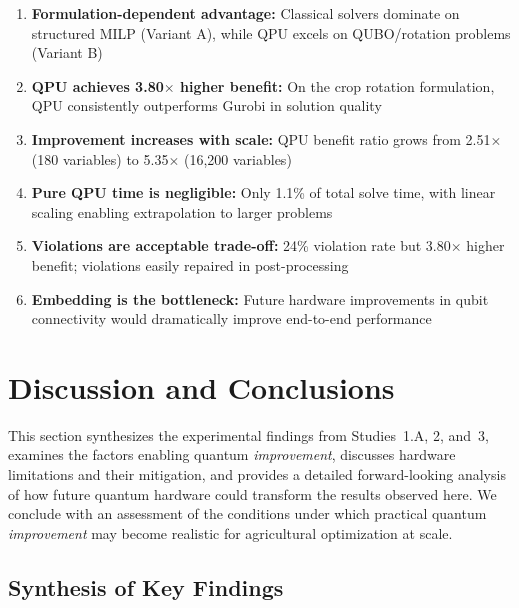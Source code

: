 \begin{enumerate}
    \item \textbf{Formulation-dependent advantage:} Classical solvers dominate on structured MILP (Variant A), while QPU excels on QUBO/rotation problems (Variant B)
    
    \item \textbf{QPU achieves 3.80$\times$ higher benefit:} On the crop rotation formulation, QPU consistently outperforms Gurobi in solution quality
    
    \item \textbf{Improvement increases with scale:} QPU benefit ratio grows from 2.51$\times$ (180 variables) to 5.35$\times$ (16,200 variables)
    
    \item \textbf{Pure QPU time is negligible:} Only 1.1\% of total solve time, with linear scaling enabling extrapolation to larger problems
    
    \item \textbf{Violations are acceptable trade-off:} 24\% violation rate but 3.80$\times$ higher benefit; violations easily repaired in post-processing
    
    \item \textbf{Embedding is the bottleneck:} Future hardware improvements in qubit connectivity would dramatically improve end-to-end performance
\end{enumerate}

\section{Discussion and Conclusions}
\label{sec:discussion}

This section synthesizes the experimental findings from Studies~1.A, 2, and~3, examines the factors enabling quantum \textit{improvement}, discusses hardware limitations and their mitigation, and provides a detailed forward-looking analysis of how future quantum hardware could transform the results observed here. We conclude with an assessment of the conditions under which practical quantum \textit{improvement} may become realistic for agricultural optimization at scale.

\subsection{Synthesis of Key Findings}

